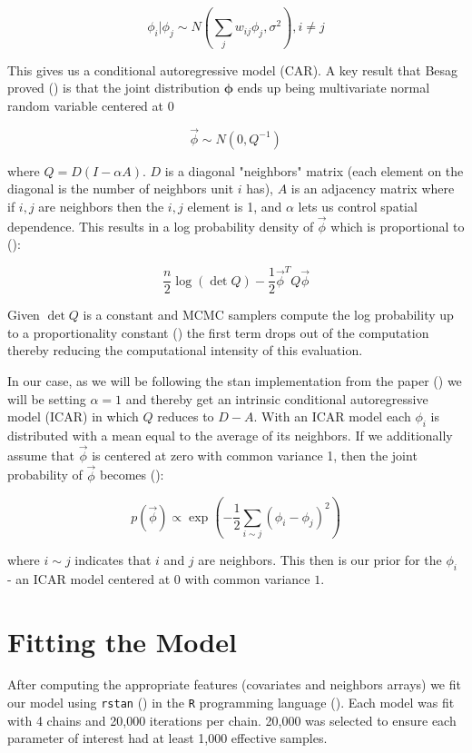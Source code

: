 \documentclass[11pt]{article}
\newcommand{\code}[1]{\colorbox{light-gray}{\texttt{#1}}}
\begin{document}
$$\phi_i | \phi_j \sim N\left(\sum_j w_{ij}\phi_j, \sigma^2  \right), i\neq j$$

This gives us a conditional autoregressive model (CAR). A key result that Besag proved (\cite{besag}) is that the joint distribution $\bm{\phi}$ ends up being multivariate normal random variable centered at 0

$$\vec{\phi}\sim N(0, Q^{-1})$$

where $Q=D(I-\alpha A)$. $D$ is a diagonal "neighbors" matrix (each element on the diagonal is the number of neighbors unit $i$ has), $A$ is an adjacency matrix where if $i,j$ are neighbors then the $i,j$ element is 1, and $\alpha$ lets us control spatial dependence. This results in a log probability density of $\vec{\phi}$ which is proportional to (\cite{bymstan}):

$$\frac{n}{2}\log{(\det{Q})}-\frac{1}{2}\vec{\phi}^T Q \vec{\phi}$$

Given $\det{Q}$ is a constant and MCMC samplers compute the log probability up to a proportionality constant (\cite{bymstan}) the first term drops out of the computation thereby reducing the computational intensity of this evaluation. 

In our case, as we will be following the stan implementation from the paper (\cite{bymstan}) we will be setting $\alpha=1$ and thereby get an intrinsic conditional autoregressive model (ICAR) in which $Q$ reduces to $D-A$. With an ICAR model each $\phi_i$ is distributed with a mean equal to the average of its neighbors. If we additionally assume that $\vec{\phi}$ is centered at zero with common variance 1, then the joint probability of $\vec{\phi}$ becomes (\cite{bymstan}):

$$p(\vec{\phi})\propto \exp{\left( -\frac{1}{2} \sum_{i\sim j} (\phi_i - \phi_j)^2 \right)}$$

where $i \sim j$ indicates that $i$ and $j$ are neighbors. This then is our prior for the $\phi_i$ - an ICAR model centered at $0$ with common variance $1$. 

\newpage

\section{Fitting the Model}

After computing the appropriate features (covariates and neighbors arrays) we fit our model using \code{rstan} (\cite{rstan}) in the \code{R} programming language (\cite{R}). Each model was fit with 4 chains and 20,000 iterations per chain. 20,000 was selected to ensure each parameter of interest had at least 1,000 effective samples. \newline
\end{document}
